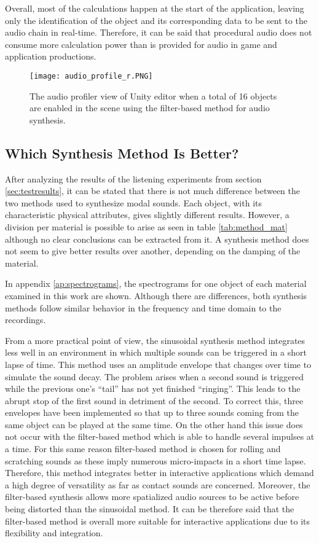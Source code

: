 Overall, most of the calculations happen at the start of the application, leaving only the identification of the object and its corresponding data to be sent to the audio chain in real-time.  Therefore, it can be said that procedural audio does not consume more calculation power than is provided for audio in game and application productions.   

\begin{figure}[H]
  \centering
    \texttt{[image: audio\_profile\_r.PNG]}
      \caption{The audio profiler view of Unity\textsuperscript{\textregistered} editor when a total of 16 objects are enabled in the scene using the filter-based method for audio synthesis.}
      \label{fig:audio_profile}
\end{figure}

\subsection{Which Synthesis Method Is Better?}
After analyzing the results of the listening experiments from section \ref{sec:testresults}, it can be stated that there is not much difference between the two methods used to synthesize modal sounds. Each object, with its characteristic physical attributes, gives slightly different results. However, a division per material is possible to arise as seen in table \ref{tab:method_mat} although no clear conclusions can be extracted from it. A synthesis method does not seem to give better results over another, depending on the damping of the material.

In appendix \ref{ap:spectrograms}, the spectrograms for one object of each material examined in this work are shown. Although there are differences, both synthesis methods follow similar behavior in the frequency and time domain to the recordings.

From a more practical point of view, the sinusoidal synthesis method integrates less well in an environment in which multiple sounds can be triggered in a short lapse of time. This method uses an amplitude envelope that changes over time to simulate the sound decay. The problem arises when a second sound is triggered while the previous one's ``tail'' has not yet finished ``ringing''. This leads to the abrupt stop of the first sound in detriment of the second. To correct this, three envelopes have been implemented so that up to three sounds coming from the same object can be played at the same time. On the other hand this issue does not occur with the filter-based method which is able to handle several impulses at a time. For this same reason filter-based method is chosen for rolling and scratching sounds as these imply numerous micro-impacts in a short time lapse. Therefore, this method integrates better in interactive applications which demand a high degree of versatility as far as contact sounds are concerned. Moreover,  the filter-based synthesis allows more spatialized audio sources to be active before being distorted than the sinusoidal method. It can be therefore said that the filter-based method is overall more suitable for interactive applications due to its flexibility and integration.


